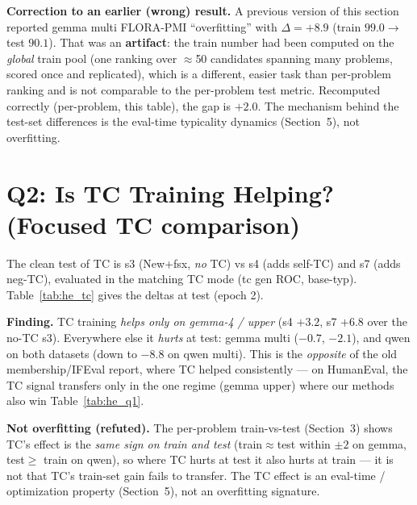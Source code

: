 \documentclass[11pt,a4paper]{article}
\begin{document}
\textbf{Correction to an earlier (wrong) result.} A previous version of this section reported
gemma multi FLORA-PMI ``overfitting'' with $\Delta=+8.9$ (train $99.0\to$ test $90.1$). That
was an \textbf{artifact}: the train number had been computed on the \emph{global} train pool
(one ranking over $\approx$50 candidates spanning many problems, scored once and replicated),
which is a different, easier task than per-problem ranking and is not comparable to the
per-problem test metric. Recomputed correctly (per-problem, this table), the gap is $+2.0$.
The mechanism behind the test-set differences is the eval-time typicality dynamics
(Section~5), not overfitting.

\section{Q2: Is TC Training Helping? (Focused TC comparison)}

The clean test of TC is s3 (New+fsx, \emph{no} TC) vs s4 (adds self-TC) and s7 (adds neg-TC),
evaluated in the matching TC mode (tc gen ROC, base-typ). Table~\ref{tab:he_tc} gives the
deltas at test (epoch 2).

\begin{table}[H]
\centering
\caption{TC effect at TEST: s3$\to$s4 (self mode) and s3$\to$s7 (neg mode), tc gen ROC
($\times100$); parenthetical = $\Delta$ from adding TC.}
\label{tab:he_tc}

\end{table}

\textbf{Finding.} TC training \emph{helps only on gemma-4 / upper} (s4 $+3.2$, s7 $+6.8$ over
the no-TC s3). Everywhere else it \emph{hurts} at test: gemma multi ($-0.7$, $-2.1$), and qwen
on both datasets (down to $-8.8$ on qwen multi). This is the \emph{opposite} of the old
membership/IFEval report, where TC helped consistently --- on HumanEval, the TC signal
transfers only in the one regime (gemma upper) where our methods also win Table~\ref{tab:he_q1}.

\textbf{Not overfitting (refuted).} The per-problem train-vs-test (Section~3) shows TC's effect
is the \emph{same sign on train and test} (train$\approx$test within $\pm2$ on gemma, test$\ge$
train on qwen), so where TC hurts at test it also hurts at train --- it is not that TC's
train-set gain fails to transfer. The TC effect is an eval-time / optimization property
(Section~5), not an overfitting signature.
\end{document}
